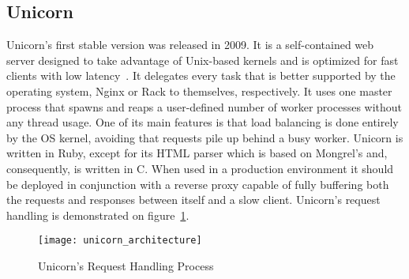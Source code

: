 \subsection{Unicorn}
Unicorn's first stable version was released in 2009. It is a self-contained web server designed to take advantage of Unix-based kernels and is optimized for fast clients with low latency~\cite{unicorn}. It delegates every task that is better supported by the operating system, Nginx or Rack to themselves, respectively. It uses one master process that spawns and reaps a user-defined number of worker processes without any thread usage. One of its main features is that load balancing is done entirely by the OS kernel, avoiding that requests pile up behind a busy worker. Unicorn is written in Ruby, except for its HTML parser which is based on Mongrel's and, consequently, is written in C. When used in a production environment it should be deployed in conjunction with a reverse proxy capable of fully buffering both the requests and responses between itself and a slow client.
Unicorn's request handling is demonstrated on figure~\ref{fig:unicorn_architecture}.
\begin{figure}[h!t]
  \centering
    \texttt{[image: unicorn\_architecture]}
    \caption{Unicorn's Request Handling Process} \label{fig:unicorn_architecture}
\end{figure}
